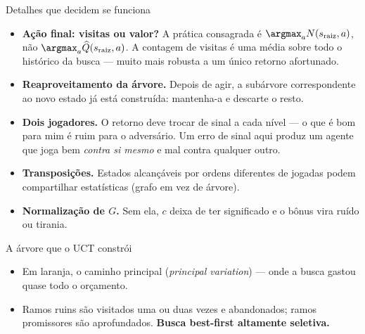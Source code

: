 \documentclass[aspectratio=169, 11pt]{beamer}
\newcommand{\Nv}[1]{N(#1)}                      %
\newcommand{\Qh}{\widehat{Q}}                   %
\newcommand{\ret}{G}                            %
\newcommand{\raiz}{s_{\mathrm{raiz}}}
\begin{document}
\begin{frame}{Detalhes que decidem se funciona}
  \begin{itemize}
    \item \textbf{Ação final: visitas ou valor?} A prática consagrada é
          $\argmax_a \Nv{\raiz,a}$, não $\argmax_a \Qh(\raiz,a)$.
          A contagem de visitas é uma média sobre todo o histórico da busca ---
          muito mais robusta a um único retorno afortunado.
    \item \textbf{Reaproveitamento da árvore.} Depois de agir, a subárvore
          correspondente ao novo estado já está construída: mantenha-a e
          descarte o resto.
    \item \textbf{Dois jogadores.} O retorno deve trocar de sinal a cada nível
          --- o que é bom para mim é ruim para o adversário. Um erro de sinal
          aqui produz um agente que joga bem \emph{contra si mesmo} e mal contra
          qualquer outro.
    \item \textbf{Transposições.} Estados alcançáveis por ordens diferentes de
          jogadas podem compartilhar estatísticas (grafo em vez de árvore).
    \item \textbf{Normalização de $\ret$.} Sem ela, $c$ deixa de ter significado
          e o bônus vira ruído ou tirania.
  \end{itemize}
\end{frame}

\begin{frame}{A árvore que o UCT constrói}
  \centering

  \vfill
  \raggedright
  \begin{itemize}
    \item Em laranja, o caminho principal (\emph{principal variation}) --- onde a
          busca gastou quase todo o orçamento.
    \item Ramos ruins são visitados uma ou duas vezes e abandonados; ramos
          promissores são aprofundados. \textbf{Busca best-first altamente
          seletiva.}
  \end{itemize}
\end{frame}
\end{document}
